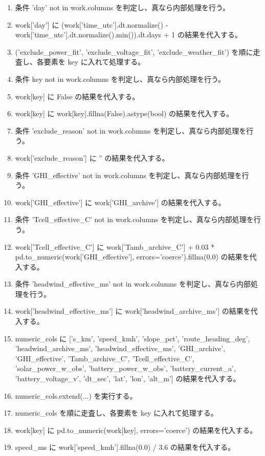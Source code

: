 \documentclass[a4paper,11pt]{article}
\begin{document}
\begin{enumerate}[leftmargin=1.8em]
\item 条件 'day' not in work.columns を判定し、真なら内部処理を行う。
\item   work['day'] に (work['time\_utc'].dt.normalize() - work['time\_utc'].dt.normalize().min()).dt.days + 1 の結果を代入する。
\item ('exclude\_power\_fit', 'exclude\_voltage\_fit', 'exclude\_weather\_fit') を順に走査し、各要素を key に入れて処理する。
\item   条件 key not in work.columns を判定し、真なら内部処理を行う。
\item     work[key] に False の結果を代入する。
\item   work[key] に work[key].fillna(False).astype(bool) の結果を代入する。
\item 条件 'exclude\_reason' not in work.columns を判定し、真なら内部処理を行う。
\item   work['exclude\_reason'] に '' の結果を代入する。
\item 条件 'GHI\_effective' not in work.columns を判定し、真なら内部処理を行う。
\item   work['GHI\_effective'] に work['GHI\_archive'] の結果を代入する。
\item 条件 'Tcell\_effective\_C' not in work.columns を判定し、真なら内部処理を行う。
\item   work['Tcell\_effective\_C'] に work['Tamb\_archive\_C'] + 0.03 * pd.to\_numeric(work['GHI\_effective'], errors='coerce').fillna(0.0) の結果を代入する。
\item 条件 'headwind\_effective\_ms' not in work.columns を判定し、真なら内部処理を行う。
\item   work['headwind\_effective\_ms'] に work['headwind\_archive\_ms'] の結果を代入する。
\item numeric\_cols に ['s\_km', 'speed\_kmh', 'slope\_pct', 'route\_heading\_deg', 'headwind\_archive\_ms', 'headwind\_effective\_ms', 'GHI\_archive', 'GHI\_effective', 'Tamb\_archive\_C', 'Tcell\_effective\_C', 'solar\_power\_w\_obs', 'battery\_power\_w\_obs', 'battery\_current\_a', 'battery\_voltage\_v', 'dt\_sec', 'lat', 'lon', 'alt\_m'] の結果を代入する。
\item numeric\_cols.extend(...) を実行する。
\item numeric\_cols を順に走査し、各要素を key に入れて処理する。
\item   work[key] に pd.to\_numeric(work[key], errors='coerce') の結果を代入する。
\item speed\_ms に work['speed\_kmh'].fillna(0.0) / 3.6 の結果を代入する。

\end{enumerate}
\end{document}
